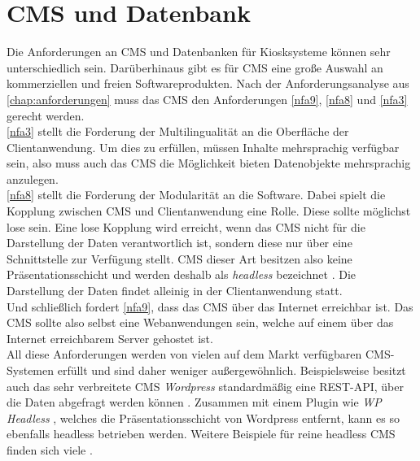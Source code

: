 \section{CMS und Datenbank}
\label{sec:backend}

Die Anforderungen an CMS und Datenbanken für Kiosksysteme können sehr unterschiedlich sein. 
Darüberhinaus gibt es für CMS eine große Auswahl an kommerziellen und freien Softwareprodukten.
Nach der Anforderungsanalyse aus \autoref{chap:anforderungen} muss das CMS den Anforderungen
\ref{nfa9}, \ref{nfa8} und \ref{nfa3} gerecht werden.\\

\ref{nfa3} stellt die Forderung der Multilingualität an die Oberfläche der Clientanwendung. 
Um dies zu erfüllen, müssen Inhalte mehrsprachig verfügbar sein, also muss auch 
das CMS die Möglichkeit bieten Datenobjekte mehrsprachig anzulegen.\\
\ref{nfa8} stellt die Forderung der Modularität an die Software. 
Dabei spielt die Kopplung zwischen CMS und 
Clientanwendung eine Rolle. Diese sollte möglichst lose sein. Eine lose Kopplung
wird erreicht, wenn das CMS nicht für die Darstellung der Daten verantwortlich ist, sondern 
diese nur über eine Schnittstelle zur Verfügung stellt. CMS dieser Art besitzen also 
keine Präsentationsschicht und werden deshalb als \emph{headless} bezeichnet \cite{headless-market}.
Die Darstellung der Daten findet alleinig in der Clientanwendung statt.\\
Und schließlich fordert \ref{nfa9}, dass das CMS über das Internet erreichbar ist. 
Das CMS sollte also selbst eine Webanwendungen sein, welche auf einem über das Internet erreichbarem Server
gehostet ist.\\

All diese Anforderungen werden von vielen auf dem Markt verfügbaren CMS-Systemen erfüllt
und sind daher weniger außergewöhnlich. Beispielsweise besitzt auch das sehr verbreitete CMS \emph{Wordpress} 
standardmäßig eine REST-API, über die Daten abgefragt werden können \cite{wordpress}. Zusammen mit einem 
Plugin wie \emph{WP Headless} \cite{wordpress-headless}, welches die Präsentationsschicht von Wordpress
entfernt, kann es so ebenfalls headless betrieben werden. Weitere Beispiele für reine headless CMS finden sich
viele \cite{headless-marktuebersicht}.\\

